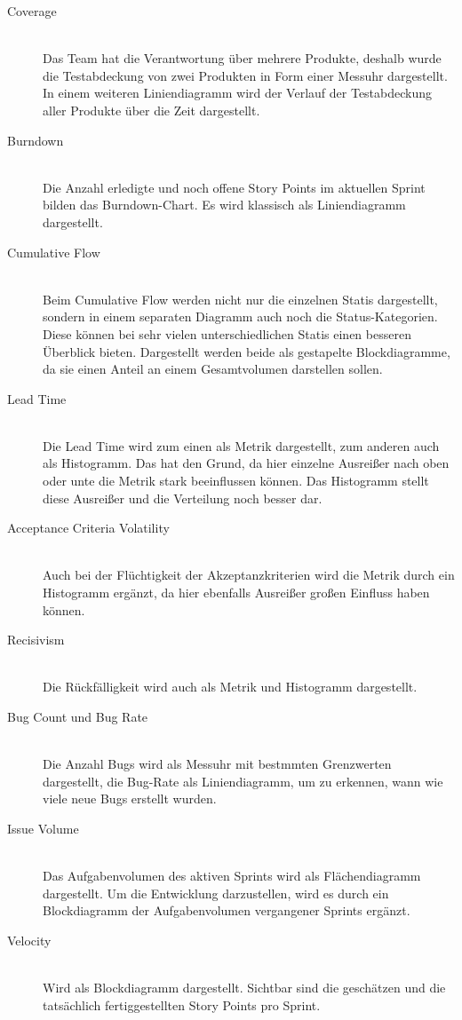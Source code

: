 \begin{description}
    \item[Coverage] \hfill \\ Das Team hat die Verantwortung über mehrere Produkte, deshalb wurde die Testabdeckung von zwei Produkten in Form einer Messuhr dargestellt. In einem weiteren Liniendiagramm wird der Verlauf der Testabdeckung aller Produkte über die Zeit dargestellt.
    \item[Burndown] \hfill \\ Die Anzahl erledigte und noch offene Story Points im aktuellen Sprint bilden das Burndown-Chart. Es wird klassisch als Liniendiagramm dargestellt.
    \item[Cumulative Flow] \hfill \\ Beim Cumulative Flow werden nicht nur die einzelnen Statis dargestellt, sondern in einem separaten Diagramm auch noch die Status-Kategorien. Diese können bei sehr vielen unterschiedlichen Statis einen besseren Überblick bieten. Dargestellt werden beide als gestapelte Blockdiagramme, da sie einen Anteil an einem Gesamtvolumen darstellen sollen.
    \item[Lead Time] \hfill \\ Die Lead Time wird zum einen als Metrik dargestellt, zum anderen auch als Histogramm. Das hat den Grund, da hier einzelne Ausreißer nach oben oder unte die Metrik stark beeinflussen können. Das Histogramm stellt diese Ausreißer und die Verteilung noch besser dar.
    \item[Acceptance Criteria Volatility] \hfill \\ Auch bei der Flüchtigkeit der Akzeptanzkriterien wird die Metrik durch ein Histogramm ergänzt, da hier ebenfalls Ausreißer großen Einfluss haben können.
    \item[Recisivism] \hfill \\ Die Rückfälligkeit wird auch als Metrik und Histogramm dargestellt.
    \item[Bug Count und Bug Rate] \hfill \\ Die Anzahl Bugs wird als Messuhr mit bestmmten Grenzwerten dargestellt, die Bug-Rate als Liniendiagramm, um zu erkennen, wann wie viele neue Bugs erstellt wurden.
    \item[Issue Volume] \hfill \\ Das Aufgabenvolumen des aktiven Sprints wird als Flächendiagramm dargestellt. Um die Entwicklung darzustellen, wird es durch ein Blockdiagramm der Aufgabenvolumen vergangener Sprints ergänzt.
    \item[Velocity] \hfill \\ Wird als Blockdiagramm dargestellt. Sichtbar sind die geschätzen und die tatsächlich fertiggestellten Story Points pro Sprint.
\end{description}

